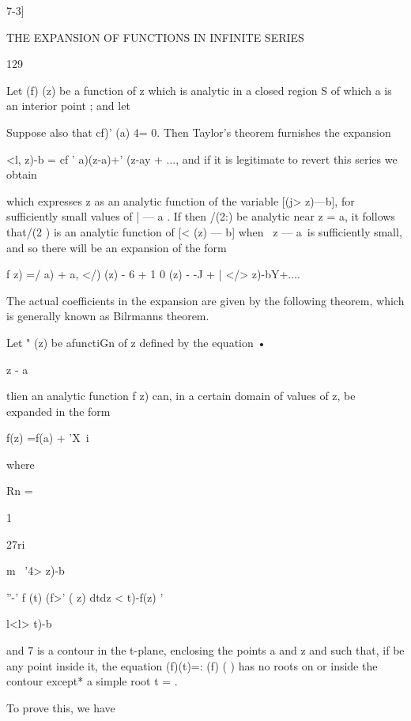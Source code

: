 7-3]



THE EXPANSION OF FUNCTIONS IN INFINITE SERIES



129



Let (f) (z) be a function of z which is analytic in a closed region S
of which a is an interior point ; and let

Suppose also that cf)' (a) 4= 0. Then Taylor's theorem furnishes the
expansion

<l, z)-b = cf ' a)(z-a)+' (z-ay + ..., and if it is legitimate to
revert this series we obtain

which expresses z as an analytic function of the variable [(j> z)—b],
for sufficiently small values of | — a . If then /(2:) be analytic
near z = a, it follows that/(2 ) is an analytic function of [< (z) —
b] when \ z — a\ is sufficiently small, and so there will be an
expansion of the form

f z) =/ a) + a, </) (z) - 6 + 1 0 (z) - -J + | </> z)-bY+....

The actual coefficients in the expansion are given by the following
theorem, which is generally known as Bilrmanns theorem.

Let " (z) be afunctiGn of z defined by the equation •

z - a

tlien an analytic function f z) can, in a certain domain of values of
z, be expanded in the form

f(z) =f(a) + 'X\ i %



where



Rn =



1

27ri



m \ '4> z)-b



''-' f (t) (f>' ( z) dtdz < t)-f(z) '



l<l> t)-b\

and 7 is a contour in the t-plane, enclosing the points a and z and
such that, if be any point inside it, the equation (f)(t)=: (f) ( )
has no roots on or inside the contour except* a simple root t = .

To prove this, we have

